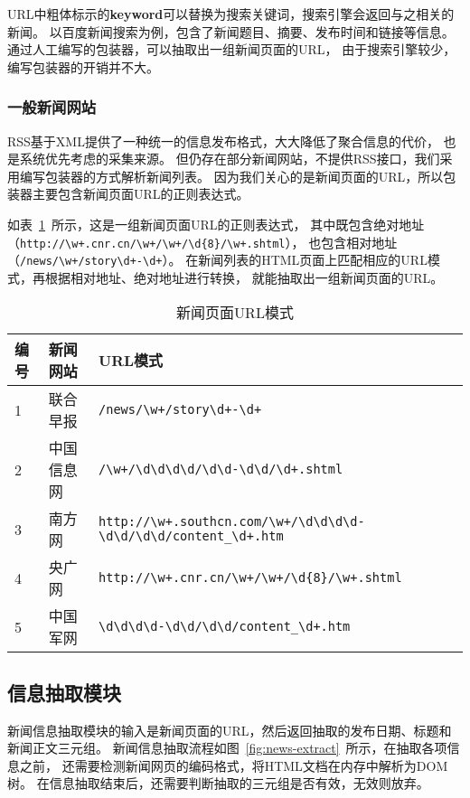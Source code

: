 URL中粗体标示的\textbf{keyword}可以替换为搜索关键词，搜索引擎会返回与之相关的新闻。
以百度新闻搜索为例，包含了新闻题目、摘要、发布时间和链接等信息。
通过人工编写的包装器，可以抽取出一组新闻页面的URL，
由于搜索引擎较少，编写包装器的开销并不大。

\subsubsection{一般新闻网站}
RSS基于XML提供了一种统一的信息发布格式，大大降低了聚合信息的代价，
也是系统优先考虑的采集来源。
但仍存在部分新闻网站，不提供RSS接口，我们采用编写包装器的方式解析新闻列表。
因为我们关心的是新闻页面的URL，所以包装器主要包含新闻页面URL的正则表达式。

如表~\ref{tbl:url-pattern}~所示，这是一组新闻页面URL的正则表达式，
其中既包含绝对地址（\verb|http://\w+.cnr.cn/\w+/\w+/\d{8}/\w+.shtml|），
也包含相对地址（\verb|/news/\w+/story\d+-\d+|）。
在新闻列表的HTML页面上匹配相应的URL模式，再根据相对地址、绝对地址进行转换，
就能抽取出一组新闻页面的URL。

\begin{table}[htbp]
\caption{新闻页面URL模式}
\label{tbl:url-pattern}
\vspace{0.5em}\centering\wuhao
\begin{tabular}{lll}
\toprule[1.5pt]
编号 & 新闻网站 & URL模式 \\
\midrule[1pt]
1 & 联合早报 & \verb|/news/\w+/story\d+-\d+| \\
2 & 中国信息网 & \verb|/\w+/\d\d\d\d/\d\d-\d\d/\d+.shtml| \\
3 & 南方网 & \verb|http://\w+.southcn.com/\w+/\d\d\d\d-\d\d/\d\d/content_\d+.htm| \\
4 & 央广网 & \verb|http://\w+.cnr.cn/\w+/\w+/\d{8}/\w+.shtml| \\
5 & 中国军网 & \verb|\d\d\d\d-\d\d/\d\d/content_\d+.htm| \\
\bottomrule[1.5pt]
\end{tabular}
\end{table}

\subsection{信息抽取模块}
新闻信息抽取模块的输入是新闻页面的URL，然后返回抽取的发布日期、标题和新闻正文三元组。
新闻信息抽取流程如图~\ref{fig:news-extract}~所示，在抽取各项信息之前，
还需要检测新闻网页的编码格式，将HTML文档在内存中解析为DOM树。
在信息抽取结束后，还需要判断抽取的三元组是否有效，无效则放弃。


